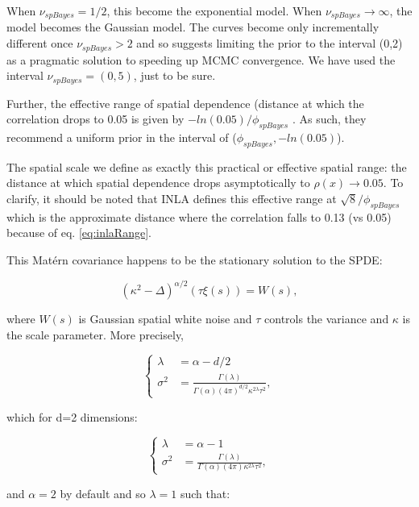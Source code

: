 \documentclass[letterpaper,portrait,11pt]{scrartcl}
\numberwithin{equation}{section}    %
\numberwithin{figure}{section}    %
\numberwithin{table}{section}       %
\begin{document}
\begin{appendices}
When $\nu_{spBayes} = 1/2$, this become the exponential model. When $\nu_{spBayes}  \rightarrow \infty$, the model becomes the Gaussian model. The curves become only incrementally different once $\nu_{spBayes} > 2$ and so \textcite{finley:2007} suggests limiting the prior to the interval (0,2) as a pragmatic solution to speeding up MCMC convergence. We have used the interval $\nu_{spBayes}= (0,5)$, just to be sure.

Further, the effective range of spatial dependence (distance at which the correlation drops to 0.05 is given by $-ln(0.05)/\phi_{spBayes}$ \parencite{finley:2007}. As such, they recommend a uniform prior in the interval of ($\phi_{spBayes}, -ln(0.05)$).

The spatial scale we define as exactly this practical or effective spatial range: the distance at which spatial dependence drops asymptotically to $\rho(x) \rightarrow 0.05$. To clarify, it should be noted that INLA defines this effective range at $\sqrt{8}/\phi_{spBayes}$ which is the approximate distance where the correlation falls to 0.13 (vs 0.05) because of eq. \ref{eq:inlaRange}.

This Mat\'{e}rn covariance happens to be the stationary solution to the SPDE:

\begin{equation}
(\kappa^2 - \Delta)^{\alpha/2} ( \tau \xi(s)) = W(s),
\end{equation}

where $W(s)$ is Gaussian spatial white noise and $\tau$ controls the variance and $\kappa$ is the scale parameter. More precisely,

\begin{equation*}
  \begin{cases}
    \lambda  &=  \alpha - d/2 \\
    \sigma^2 &=  \frac{\Gamma(\lambda)}{\Gamma(\alpha)(4\pi)^{d/2}{\kappa}^{2\lambda} \tau^2 },
  \end{cases}
\end{equation*}

which for d=2 dimensions:

\begin{equation*}
\begin{cases}
\lambda  &=  \alpha - 1 \\
\sigma^2 &=  \frac{\Gamma(\lambda)}{\Gamma(\alpha)(4\pi){\kappa}^{2\lambda} \tau^2 },
\end{cases}
\end{equation*}

and $\alpha=2$ by default and so $\lambda=1$ such that:



\end{appendices}
\end{document}
